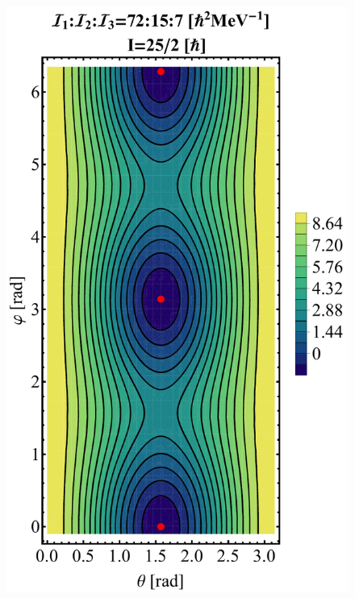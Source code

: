 \documentclass[myclassdoc,debug]{rjparticle}
\begin{document}
\begin{figure}[ht]
\centering
\begin{minipage}{.5\textwidth}
  \centering
  \includegraphics[scale=0.3]{figs/contour-tsd1.pdf}
\end{minipage}%
\begin{minipage}{.5\textwidth}
  \centering

\end{minipage}
\end{figure}
\end{document}
